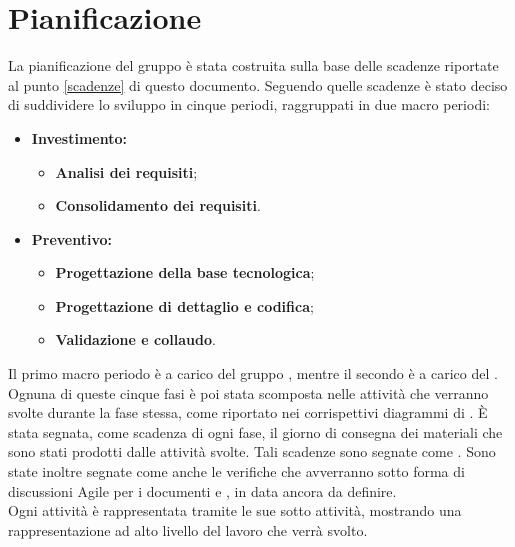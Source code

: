 \documentclass[PianoDiProgetto.tex]{subfiles}
\begin{document}
\chapter{Pianificazione}
La pianificazione del gruppo \gruppo è stata costruita sulla base delle scadenze riportate al punto \ref{scadenze} di questo documento. Seguendo quelle scadenze è stato deciso di suddividere lo sviluppo in cinque periodi, raggruppati in due macro periodi:
\begin{itemize}
	\item \textbf{Investimento:}
		\begin{itemize}
			\item \textbf{Analisi dei requisiti};
			\item \textbf{Consolidamento dei requisiti}.
		\end{itemize}
	\item \textbf{Preventivo:}
		\begin{itemize}
			\item \textbf{Progettazione della base tecnologica};
			\item \textbf{Progettazione di dettaglio e codifica};
			\item \textbf{Validazione e collaudo}.
		\end{itemize}
\end{itemize}
Il primo macro periodo è a carico del gruppo \gruppo, mentre il secondo è a carico del .\\
Ognuna di queste cinque fasi è poi stata scomposta nelle attività che verranno svolte durante la fase stessa, come riportato nei corrispettivi diagrammi di . \`{E} stata segnata, come scadenza di ogni fase, il giorno di consegna dei materiali che sono stati prodotti dalle attività svolte. Tali scadenze sono segnate come .
Sono state inoltre segnate come  anche le verifiche che avverranno sotto forma di discussioni Agile per i documenti \tb e \pb, in data ancora da definire.\\ Ogni attività è rappresentata tramite le sue sotto attività, mostrando una rappresentazione ad alto livello del lavoro che verrà svolto.
\newpage
\end{document}
